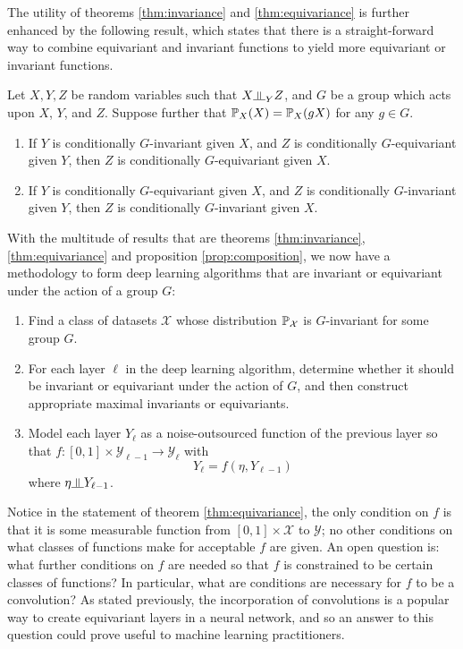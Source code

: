 The utility of theorems \ref{thm:invariance} and \ref{thm:equivariance} is further enhanced by the following result, which states that there is a straight-forward way to combine equivariant and invariant functions to yield more equivariant or invariant functions.
\begin{proposition} \label{prop:composition}
Let $X,Y,Z$ be random variables such that $X \indep_Y Z$, and $G$ be a group which acts upon $X$, $Y$, and $Z$.
Suppose further that $\mathbb{P}_X(X) = \mathbb{P}_X(gX)$ for any $g \in G$.
\begin{enumerate}
	\item
	If $Y$ is conditionally $G$-invariant given $X$, and $Z$ is conditionally $G$-equivariant given $Y$, then $Z$ is conditionally $G$-equivariant given $X$.
	
	\item
	If $Y$ is conditionally $G$-equivariant given $X$, and $Z$ is conditionally $G$-invariant given $Y$, then $Z$ is conditionally $G$-invariant given $X$.
\end{enumerate}
\end{proposition}

With the multitude of results that are theorems \ref{thm:invariance}, \ref{thm:equivariance} and proposition \ref{prop:composition}, we now have a methodology to form deep learning algorithms that are invariant or equivariant under the action of a group $G$:
\begin{enumerate}
	\item Find a class of datasets $\mathcal{X}$ whose distribution $\mathbb{P}_{\mathcal{X}}$ is $G$-invariant for some group $G$.
	\item For each layer $\ell$ in the deep learning algorithm, determine whether it should be invariant or equivariant under the action of $G$, and then construct appropriate maximal invariants or equivariants.
	\item Model each layer $Y_{\ell}$ as a noise-outsourced function of the previous layer so that $f: [0,1] \times \mathcal{Y}_{\ell-1} \to \mathcal{Y}_{\ell}$ with
	$$
		Y_{\ell} = f(\eta, Y_{\ell-1})
	$$
	where $\eta \indep Y_{\ell-1}$.

\end{enumerate}
Notice in the statement of theorem \ref{thm:equivariance}, the only condition on $f$ is that it is some measurable function from $[0,1]\times \mathcal{X}$ to $\mathcal{Y}$; no other conditions on what classes of functions make for acceptable $f$ are given.
An open question is: what further conditions on $f$ are needed so that $f$ is constrained to be certain classes of functions?
In particular, what are conditions are necessary for $f$ to be a convolution?
As stated previously, the incorporation of convolutions is a popular way to create equivariant layers in a neural network, and so an answer to this question could prove useful to machine learning practitioners. 

